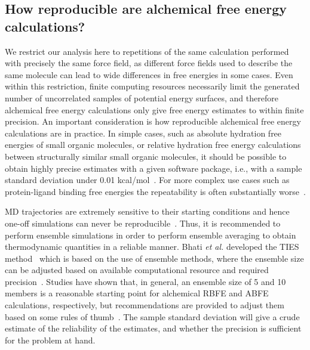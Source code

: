 \documentclass[9pt,bestpractices]{livecoms}
\begin{document}
\subsection{How reproducible are alchemical free energy calculations?}
\label{subsec:reproducible}
We restrict our analysis here to repetitions of the same calculation performed with precisely the same force field, as different force fields used to describe the same molecule can lead to wide differences in free energies in some cases.  Even within this restriction,
finite computing resources necessarily limit the generated number of uncorrelated samples of potential energy surfaces, and therefore alchemical free energy calculations only give free energy estimates to within finite precision. An important consideration is how reproducible alchemical free energy calculations are in practice. In simple cases, such as absolute hydration free energies of small organic molecules, or relative hydration free energy calculations between structurally similar small organic molecules, it should be possible to obtain highly precise estimates with a given software package, i.e., with a sample standard deviation under 0.01 kcal/mol~\cite{rizzi2019sampl6}.
For more complex use cases such as protein-ligand binding free energies the repeatability is often substantially worse~\cite{rizzi2019sampl6}. 

MD trajectories are extremely sensitive to their starting conditions and hence one-off simulations can never be reproducible~\cite{coveney2016, MDbook2025, caves_locally_1998}. Thus, it is recommended to perform ensemble simulations in order to perform ensemble averaging to obtain thermodynamic quantities in a reliable manner. Bhati \textit{et al.} developed the TIES method~\cite{bhati2017, bhati2022, bhati2025} which is based on the use of ensemble methods, where the ensemble size can be adjusted based on available computational resource and required precision~\cite{wan2023}. Studies have shown that, in general, an ensemble size of 5 and 10 members is a reasonable starting point for alchemical RBFE and ABFE calculations, respectively, but recommendations are provided to adjust them based on some rules of thumb~\cite{bhati2022, bhati2025}. 
The sample standard deviation will give a crude estimate of the reliability of the estimates, and whether the precision is sufficient for the problem at hand.

\end{document}
